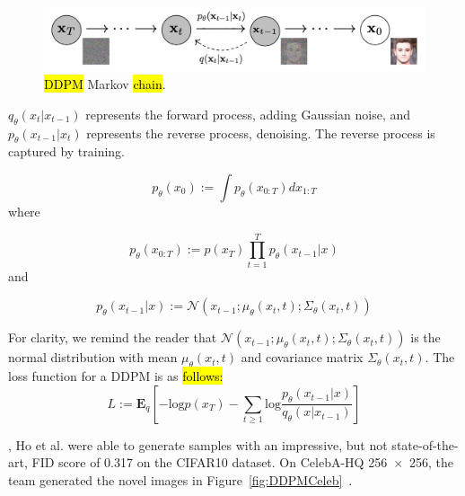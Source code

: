 \documentclass[technologies,article,accept,pdftex,moreauthors]{Definitions/mdpi}
\newcommand{\figref}[1]{Figure~\ref{#1}}
\begin{document}
\begin{figure}[H]
    \includegraphics[width=\columnwidth]{ddpm.png}
    \caption{\label{fig:ddpm}\hl{DDPM} %
 Markov \hl{chain}.}
\end{figure}


$q_\theta(x_t|x_{t-1} )$  represents the forward process, adding Gaussian noise, and $p_\theta(x_{t-1}|x_t )$ represents the reverse process, denoising. The reverse process is captured by training.

\begin{equation}
p_\theta(x_0) :=\int p_\theta(x_{0:T} ) dx_{1:T}
\end{equation}
where

\begin{equation}
p_\theta(x_{0:T}) := p(x_T)\prod_{t=1}^{T} p_\theta(x_{t-1}|x)
\end{equation}
and

\begin{equation}
p_\theta(x_{t-1}|x) := \mathcal{N}(x_{t-1};\mu_\theta(x_t,t); \Sigma_\theta(x_t,t))
\end{equation}

For clarity, we remind the reader that $\mathcal{N}(x_{t-1};\mu_\theta(x_t,t); \Sigma_\theta(x_t,t))$ is the normal distribution with mean $\mu_\theta(x_t,t)$ and covariance matrix $\Sigma_\theta(x_t,t)$. The loss function for a DDPM is as \hl{follows:} %
\begin{equation}
L := \mathbf{E}_q[-\mathrm{log} p(x_T) - \sum_{t\ge1}\mathrm{log} \frac{p_\theta(x_{t-1}|x )}{q_\theta(x|x_{t-1} )}]
\end{equation}


, Ho et al. were able to generate samples with an impressive, but not state-of-the-art, FID score of 0.317 on the CIFAR10 dataset. On CelebA-HQ 256~$\times$~256, the team generated the novel images in \figref{fig:DDPMCeleb}~\cite{ho2020denoising}.
\end{document}
